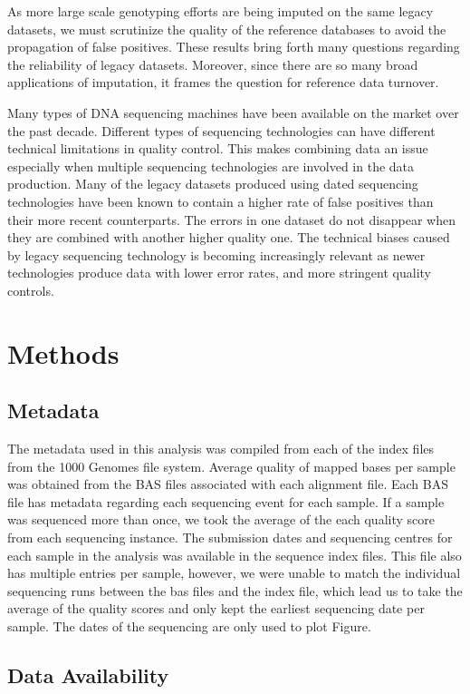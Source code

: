 \documentclass[9pt,lineno]{elife}
\begin{document}
As more large scale genotyping efforts are being imputed on the same legacy datasets, we must scrutinize the quality of the reference databases to avoid the propagation of false positives. 
These results bring forth many questions regarding the reliability of legacy datasets. 
Moreover, since there are so many broad applications of imputation, it frames the question for reference data turnover. 

Many types of DNA sequencing machines have been available on the market over the past decade.
Different types of sequencing technologies can have different technical limitations in quality control.
This makes combining data an issue especially when multiple sequencing technologies are involved in the data production.
Many of the legacy datasets produced using dated sequencing technologies have been known to contain a higher rate of false positives than their more recent counterparts.
The errors in one dataset do not disappear when they are combined with another higher quality one.
The technical biases caused by legacy sequencing technology is becoming increasingly relevant as newer technologies produce data with lower error rates, and more stringent quality controls.




\section{Methods}
\subsection{Metadata}
The metadata used in this analysis was compiled from each of the index files from the 1000 Genomes file system. 
Average quality of mapped bases per sample was obtained from the BAS files associated with each alignment file. 
Each BAS file has metadata regarding each sequencing event for each sample. 
If a sample was sequenced more than once, we took the average of the each quality score from each sequencing instance. 
The submission dates and sequencing centres for each sample in the analysis was available in the sequence index files.  
This file also has multiple entries per sample, however, we were unable to match the individual sequencing runs between the bas files and the index file, which lead us to take the average of the quality scores and only kept the earliest sequencing date per sample. 
The dates of the sequencing are only used to plot Figure.

\subsection{Data Availability}
\end{document}

